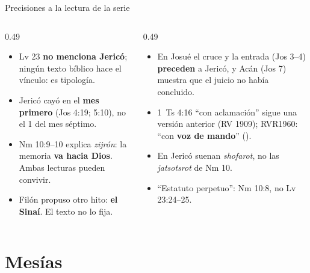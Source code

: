 \begin{frame}{Precisiones a la lectura de la serie}
\scriptsize\RaggedRight
\begin{columns}[t,onlytextwidth]
\begin{column}{0.49\textwidth}
\begin{itemize}
\item Lv 23 \textbf{no menciona Jericó}; ningún texto bíblico hace el vínculo: es tipología.
\item Jericó cayó en el \textbf{mes primero} (Jos 4:19; 5:10), no el 1 del mes séptimo.
\item Nm 10:9--10 explica \emph{zijrón}: la memoria \textbf{va hacia Dios}. Ambas lecturas pueden convivir.
\item Filón propuso otro hito: \textbf{el Sinaí}. El texto no lo fija.
\end{itemize}
\end{column}
\begin{column}{0.49\textwidth}
\begin{itemize}
\item En Josué el cruce y la entrada (Jos 3--4) \textbf{preceden} a Jericó, y Acán (Jos 7) muestra que el juicio no había concluido.
\item 1~Ts 4:16 ``con aclamación'' sigue una versión anterior (RV 1909); RVR1960: ``con \textbf{voz de mando}'' ().
\item En Jericó suenan \emph{shofarot}, no las \emph{jatsotsrot} de Nm 10.
\item ``Estatuto perpetuo'': Nm 10:8, no Lv 23:24--25.
\end{itemize}
\end{column}
\end{columns}
\end{frame}

\section{Mesías}



